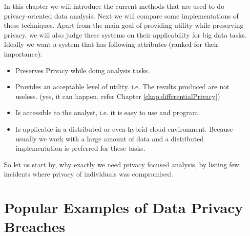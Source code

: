 \documentclass[12pt]{report}
\theoremstyle{named}
\begin{document}
In this chapter we will introduce the current methods that are used to do privacy-oriented data analysis. Next we will compare some implementations of these techniques. Apart from the main goal of providing utility while preserving privacy, we will also judge these systems on their applicability for big data tasks. Ideally we want a system that has following attributes (ranked for their importance):
\begin{itemize}
  \item Preserves Privacy while doing analysis tasks.
  \item Provides an acceptable level of utility. i.e. The results produced are not useless. (yes, it can happen, refer Chapter \ref{chap:differentialPrivacy})
  \item Is accessible to the analyst, i.e. it is easy to use and program.
  \item Is applicable in a distributed or even hybrid cloud environment. Because usually we work with a large amount of data and a distributed implementation is preferred for these tasks.
\end{itemize}

So let us start by, why exactly we need privacy focused analysis, by listing few incidents where privacy of individuals was compromised.


\section{Popular Examples of Data Privacy Breaches}
\end{document}
